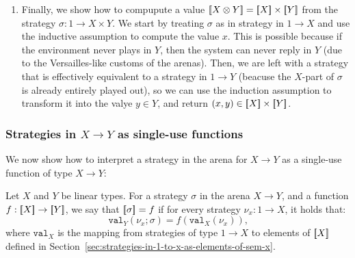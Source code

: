 \begin{enumerate}
    \item Finally, we show how to compupute a value $[{\kern-0.45ex}[X \otimes Y]{\kern-0.45ex}] = [{\kern-0.45ex}[X]{\kern-0.45ex}] \times [{\kern-0.45ex}[Y]{\kern-0.45ex}]$ from 
          the strategy $\sigma : 1 \to X \times Y$. We start by treating $\sigma$ as in strategy 
          in $1 \to X$ and use the inductive assumption to compute the value $x$.
          This is possible because if the environment never plays in $Y$, then 
          the system can never reply in $Y$ (due to the Versailles-like customs of the arenas).
          Then, we are left with a strategy that is effectively equivalent to a strategy
          in $1 \to Y$ (beacuse the $X$-part of $\sigma$ is already entirely played out), 
          so we can use the induction assumption to transform it into the valye $y \in Y$, 
          and return $(x, y) \in [{\kern-0.45ex}[X]{\kern-0.45ex}] \times [{\kern-0.45ex}[Y]{\kern-0.45ex}]$. 
\end{enumerate}



\subsubsection{Strategies in $X \to Y$ as single-use functions}
We now show how to interpret a strategy in the arena for $X \to Y$ as a single-use function of type $X \to Y$:

\begin{definition}\label{def:strategy-as-single-use-function}
    Let $X$ and $Y$ be linear types. For a strategy $\sigma$ in the arena $X \to Y$,
    and a function $f : [{\kern-0.45ex}[X]{\kern-0.45ex}] \to [{\kern-0.45ex}[Y]{\kern-0.45ex}]$, we say that $[{\kern-0.45ex}[\sigma]{\kern-0.45ex}] = f$ if for every strategy 
    $\nu_x : 1 \to X$, it holds that: 
    \[ \mathtt{val}_Y(\nu_x ; \sigma) = f(\mathtt{val}_X(\nu_x)) \textrm{,} \]
    where $\mathtt{val}_X$ is the mapping from strategies of type $1 \to X$ to elements of $[{\kern-0.45ex}[X]{\kern-0.45ex}]$ 
    defined in Section~\ref{sec:strategies-in-1-to-x-as-elements-of-sem-x}.
\end{definition}

